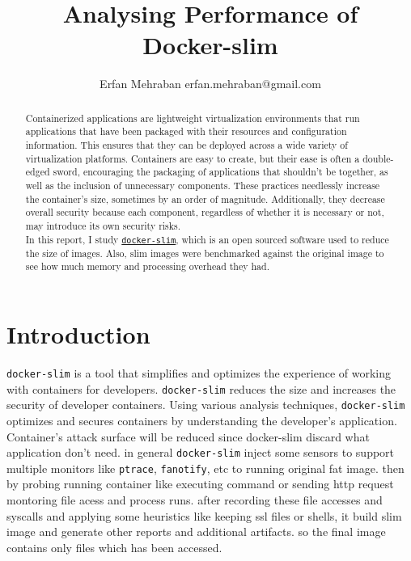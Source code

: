 \documentclass[10pt]{article}
\title{Analysing Performance of \\Docker-slim}
\author{\name Erfan Mehraban \email erfan.mehraban@gmail.com}
\begin{document}
\maketitle

\begin{abstract}
Containerized applications are lightweight virtualization environments that run applications that have been packaged with their resources and configuration information. This ensures that they can be deployed across a wide variety of virtualization platforms. Containers are easy to create, but their ease is often a double-edged sword, encouraging the packaging of applications that shouldn't be together, as well as the inclusion of unnecessary components. These practices needlessly increase the container's size, sometimes by an order of magnitude. Additionally, they decrease overall security because each component, regardless of whether it is necessary or not, may introduce its own security risks. \\
In this report, I study \href{https://github.com/docker-slim/docker-slim}{\tt docker-slim}, which is an open sourced software used to reduce the size of images. Also, slim images were benchmarked against the original image to see how much memory and processing overhead they had.
\end{abstract}

\section{Introduction}
{\tt docker-slim} is a tool that simplifies and optimizes the experience of working with containers for developers. {\tt docker-slim} reduces the size and increases the security of developer containers. Using various analysis techniques, {\tt docker-slim} optimizes and secures containers by understanding the developer's application. Container's attack surface will be reduced since docker-slim discard what application don't need.
in general {\tt docker-slim} inject some sensors to support multiple monitors like {\tt ptrace}, {\tt fanotify}, etc to running original fat image. then by probing running container like executing command or sending http request montoring file acess and process runs. after recording these file accesses and syscalls and applying some heuristics like keeping ssl files or shells, it build slim image and generate other reports and additional artifacts. so the final image contains only files which has been accessed.
\end{document}
